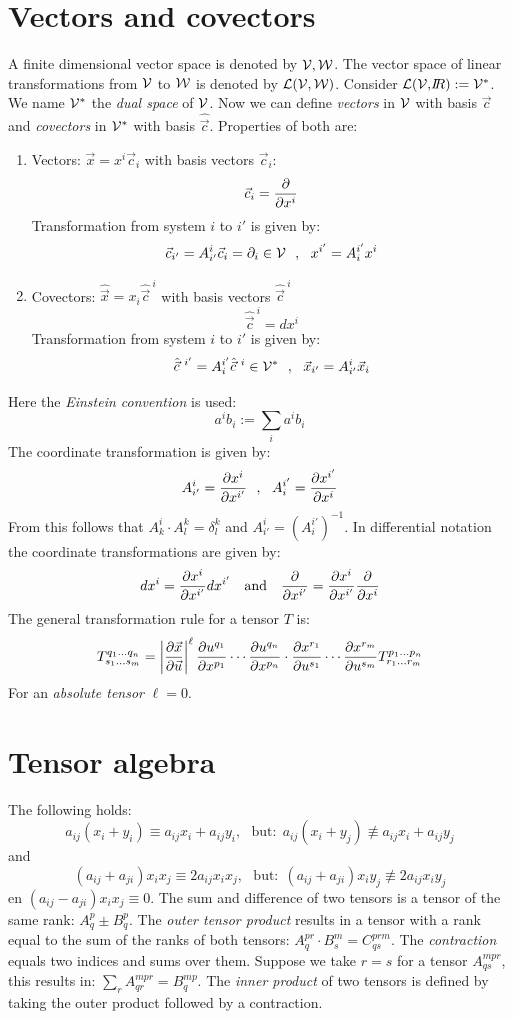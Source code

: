 \documentclass[twoside]{report}
\begin{document}
\section{Vectors and covectors}
A finite dimensional vector space is denoted by $\cal V, W$. The vector
space of linear transformations from $\cal V$ to $\cal W$ is denoted by
$\cal L(V,W)$. Consider ${\cal L(V,}I\hspace{-1mm}R):={\cal V}^*$. We name $\cal V^*$ the
{\it dual space} of $\cal V$. Now we can define {\it vectors} in $\cal V$ with
basis $\vec{c}$ and {\it covectors} in $\cal V^*$ with basis $\hat{\vec{c}}$.
Properties of both are:
\begin{enumerate}
\item Vectors: $\vec{x}=x^i\vec{c}_i$ with basis vectors $\vec{c}_i$:
      \[
      \vec{c}_i=\frac{\partial }{\partial x^i}
      \]
      Transformation from system $i$ to $i'$ is given by:
      \[
      \vec{c}_{i'}=A_{i'}^i\vec{c}_i=\partial_i\in{\cal V}~~,~~x^{i'}=A_i^{i'}x^i
      \]
\item Covectors: $\hat{\vec{x}}=x_i\hat{\vec{c}}^{~i}$ with basis vectors $\hat{\vec{c}}^{~i}$
      \[
      \hat{\vec{c}}^{~i}=dx^i
      \]
      Transformation from system $i$ to $i'$ is given by:
      \[
      \hat{\vec{c}}^{~i'}=A_i^{i'}\hat{\vec{c}}^{~i}\in{\cal V}^*~~,~~\vec{x}_{i'}=A_{i'}^i\vec{x}_i
      \]
\end{enumerate}
Here the {\it Einstein convention} is used:
\[
a^ib_i:=\sum_ia^ib_i
\]
The coordinate transformation is given by:
\[
A_{i'}^i=\frac{\partial x^i}{\partial x^{i'}}~~,~~A_i^{i'}=\frac{\partial x^{i'}}{\partial x^i}
\]
From this follows that $A_k^i\cdot A_l^k=\delta_l^k$ and $A_{i'}^i=(A_i^{i'})^{-1}$.
\npar
In differential notation the coordinate transformations are given by:
\[
dx^i=\frac{\partial x^i}{\partial x^{i'}}dx^{i'}~~~\mbox{and}~~~\frac{\partial }{\partial x^{i'}}=\frac{\partial x^i}{\partial x^{i'}}\frac{\partial }{\partial x^i}
\]
The general transformation rule for a tensor $T$ is:
\[
T_{s_1...s_m}^{q_1...q_n}=\left|\frac{\partial \vec{x}}{\partial \vec{u}}\right|^\ell
\frac{\partial u^{q_1}}{\partial x^{p_1}}\cdots\frac{\partial u^{q_n}}{\partial x^{p_n}}\cdot\frac{\partial x^{r_1}}{\partial u^{s_1}}\cdots\frac{\partial x^{r_m}}{\partial u^{s_m}}T_{r_1...r_m}^{p_1...p_n}
\]
For an {\it absolute tensor} $\ell=0$.

\section{Tensor algebra}
The following holds:
\[
a_{ij}(x_i+y_i)\equiv a_{ij}x_i+a_{ij}y_i,~~~\mbox{but:}~~a_{ij}(x_i+y_j)\not\equiv a_{ij}x_i+a_{ij}y_j
\]
and
\[
(a_{ij}+a_{ji})x_ix_j\equiv2a_{ij}x_ix_j,~~~\mbox{but:}~~(a_{ij}+a_{ji})x_iy_j\not\equiv 2a_{ij}x_iy_j
\]
en $(a_{ij}-a_{ji})x_ix_j\equiv0$.
\npar
The sum and difference of two tensors is a tensor of the same rank:
$A_q^p\pm B_q^p$. The {\it outer tensor product} results in a tensor with a
rank equal to the sum of the ranks of both tensors:
$A_q^{pr}\cdot B_s^m=C_{qs}^{prm}$. The {\it contraction} equals two indices
and sums over them. Suppose we take $r=s$ for a tensor $A_{qs}^{mpr}$, this
results in: $\sum\limits_r A_{qr}^{mpr}=B_q^{mp}$. The
{\it inner product} of two tensors is defined by taking the outer product
followed by a contraction.
\end{document}
